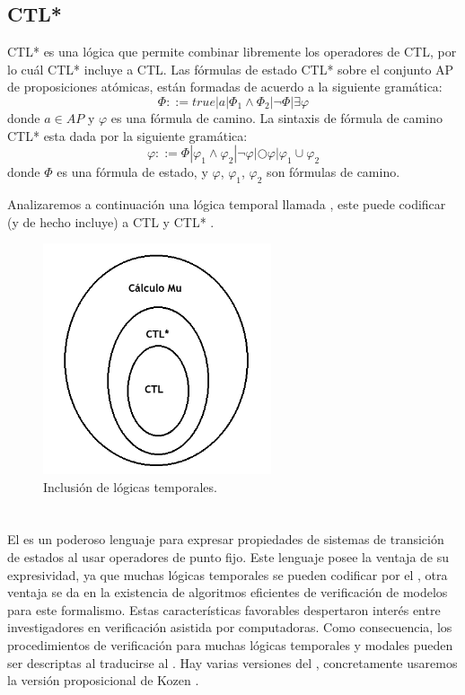 \subsection{CTL*}

\noindent CTL* es una lógica que permite combinar libremente los operadores de CTL, por lo cuál CTL* incluye a CTL. Las fórmulas de estado CTL* sobre el conjunto AP de proposiciones atómicas, están formadas de acuerdo a la siguiente gramática\cite{Baier:2}:
\[\Phi ::= true | a | \Phi_{1} \land \Phi_{2} | \neg \Phi | \exists \varphi \]
donde $a \in AP$ y $\varphi$ es una fórmula de camino. La sintaxis de fórmula de camino CTL* esta dada por la siguiente gramática:
\[\varphi ::= \Phi | \varphi_{1} \land \varphi_{2} | \neg \varphi | \bigcirc \varphi | \varphi_{1} \cup \varphi_{2} \]
donde $\Phi$ es una fórmula de estado, y $\varphi$, $\varphi_{1}$, $\varphi_{2}$ son fórmulas de camino.

\noindent Analizaremos a continuación una lógica temporal llamada {\mucalculo}, este puede codificar (y de hecho incluye) a CTL y CTL* \cite{Emerson:16}.

\begin{figure}[H]
  \centering
  \includegraphics[width=0.6\textwidth]{Figures/inclusiontemplogic.png}
  \caption{Inclusión de lógicas temporales.} 
  \label{fig:templogics}
\end{figure}


\section{{\mucalculo}}

\noindent El {\mucalculo} es un poderoso lenguaje para expresar propiedades de sistemas de transición de estados al usar operadores de punto fijo. Este lenguaje posee la ventaja de su expresividad, ya que muchas lógicas temporales se pueden codificar por el {\mucalculo}, otra ventaja se da en la existencia de algoritmos eficientes de verificación de modelos para este formalismo. Estas características favorables despertaron interés entre investigadores en verificación asistida por computadoras. Como consecuencia, los procedimientos de verificación para muchas lógicas temporales y modales pueden ser descriptas al traducirse al {\mucalculo}. Hay varias versiones del {\mucalculo}, concretamente usaremos la versión proposicional de Kozen\cite{Kozen:3} \cite{Clarke:1}.

